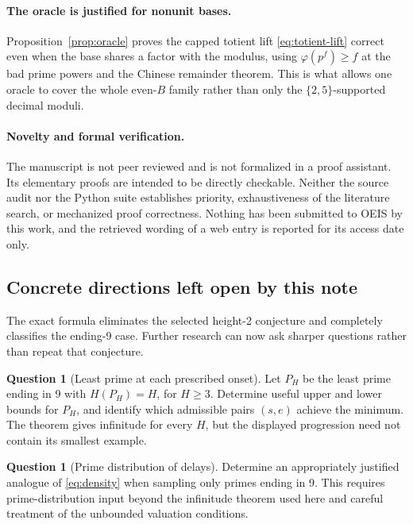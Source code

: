 \documentclass[11pt,letterpaper]{article}
\numberwithin{equation}{section}
\theoremstyle{definition}
\newtheorem{question}[theorem]{Question}
\theoremstyle{remark}
\begin{document}
\paragraph{The oracle is justified for nonunit bases.}
Proposition~\ref{prop:oracle} proves the capped totient lift \eqref{eq:totient-lift} correct even when the base shares a factor with the modulus, using $\varphi(p^f)\ge f$ at the bad prime powers and the Chinese remainder theorem. This is what allows one oracle to cover the whole even-$B$ family rather than only the $\{2,5\}$-supported decimal moduli.

\paragraph{Novelty and formal verification.}
The manuscript is not peer reviewed and is not formalized in a proof assistant. Its elementary proofs are intended to be directly checkable. Neither the source audit nor the Python suite establishes priority, exhaustiveness of the literature search, or mechanized proof correctness. Nothing has been submitted to OEIS by this work, and the retrieved wording of a web entry is reported for its access date only.

\subsection{Concrete directions left open by this note}

The exact formula eliminates the selected height-2 conjecture and completely classifies the ending-9 case. Further research can now ask sharper questions rather than repeat that conjecture.

\begin{question}[Least prime at each prescribed onset]
Let $P_H$ be the least prime ending in 9 with $H(P_H)=H$, for $H\ge3$. Determine useful upper and lower bounds for $P_H$, and identify which admissible pairs $(s,e)$ achieve the minimum. The theorem gives infinitude for every $H$, but the displayed progression need not contain its smallest example.
\end{question}

\begin{question}[Prime distribution of delays]
Determine an appropriately justified analogue of \eqref{eq:density} when sampling only primes ending in 9. This requires prime-distribution input beyond the infinitude theorem used here and careful treatment of the unbounded valuation conditions.
\end{question}
\end{document}
